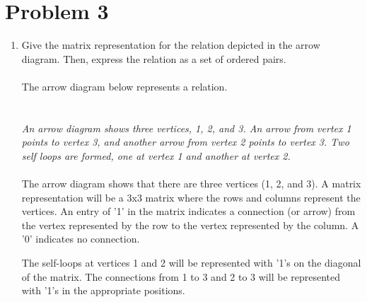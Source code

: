 \documentclass{amsart}
\theoremstyle{definition}
\theoremstyle{Exercise}
\theoremstyle{remark}
\theoremstyle{rule}
\numberwithin{equation}{section}
\begin{document}
    \newpage



\section*{Problem 3}

\begin{enumerate}[label=(\alph*)]
\item  Give the matrix representation for the relation depicted in the arrow diagram. Then, express the relation as a set of ordered pairs.\\\\
The arrow diagram below represents a relation.\\
\\\\
{\color{blue}{\bf Figure 1:} \emph{An arrow diagram shows three vertices, 1, 2, and 3. An arrow from vertex 1 points to vertex 3, and another arrow from vertex 2 points to vertex 3. Two self loops are formed, one at vertex 1 and another at vertex 2. 
}
}
\\\\
The arrow diagram shows that there are three vertices (1, 2, and 3). A matrix representation will be a 3x3 matrix where the rows and columns represent the vertices. An entry of '1' in the matrix indicates a connection (or arrow) from the vertex represented by the row to the vertex represented by the column. A '0' indicates no connection. 

The self-loops at vertices 1 and 2 will be represented with '1's on the diagonal of the matrix. The connections from 1 to 3 and 2 to 3 will be represented with '1's in the appropriate positions.


\end{enumerate}
\end{document}
